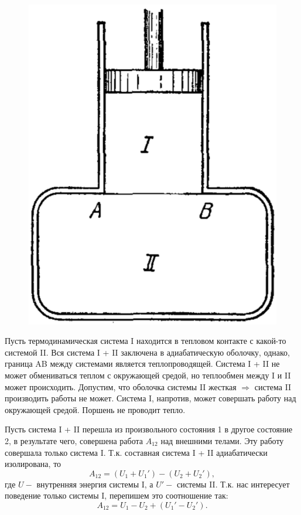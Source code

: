\documentclass[14pt,a4paper]{scrartcl}
\begin{document}
		\begin{figure} 
			\vspace{-2ex}
			\hspace{5ex}
			\includegraphics[width=\linewidth]{termostat.png}
		\end{figure}
		\quad  Пусть термодинамическая система I находится в тепловом контакте с какой-то системой II. Вся система I + II заключена в адиабатическую оболочку, однако, граница AB между системами является теплопроводящей. Система I + II  не может обмениваться теплом с окружающей средой, но теплообмен между I и II может происходить. Допустим, что оболочка системы II жесткая $\Rightarrow$ система II производить работы не может. Система I, напротив, может совершать работу над окружающей средой. Поршень не проводит тепло. 

		\quad Пусть система I + II  перешла из произвольного состояния 1 в другое состояние 2, в результате чего, совершена работа $A_{12}$ над внешними телами. Эту работу совершала только система I. Т.к. составная система I + II адиабатически изолирована, то $$A_{12} = (U_1 + U_1')-(U_2+U_2'),$$ где $U - $ внутренняя энергия системы I, а $U'-$ системы II. Т.к. нас интересует поведение только системы I, перепишем это соотношение так: $$A_{12} = U_1 - U_2 + (U_1' - U_2').$$
		
\end{document}
